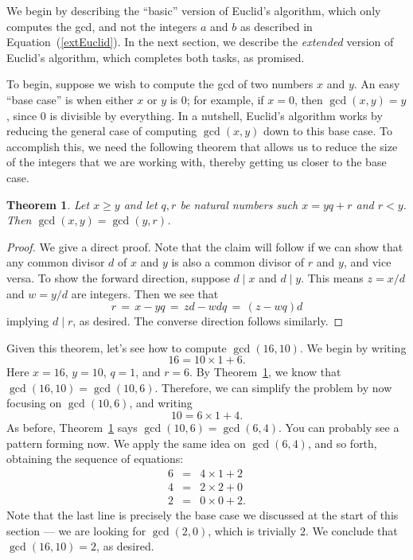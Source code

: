 \documentclass[11pt]{article}
\newcounter{thm}
\newtheorem{theorem}{Theorem}[thm]
\begin{document}
We begin by describing the ``basic'' version of Euclid's algorithm, which only computes the gcd, and not the integers $a$ and $b$ as described in Equation~(\ref{extEuclid}). In the next section, we describe the \emph{extended} version of Euclid's algorithm, which completes both tasks, as promised.

To begin, suppose we wish to compute the gcd of two numbers $x$ and $y$. An easy ``base case'' is when either $x$ or $y$ is 0; for example, if $x=0$, then $\gcd(x,y)=y$, since $0$ is divisible by everything. In a nutshell, Euclid's algorithm works by reducing the general case of computing $\gcd(x,y)$ down to this base case. To accomplish this, we need the following theorem that allows us to reduce the size of the integers that we are working with, thereby getting us closer to the base case.

\begin{theorem}\label{thm:samediv}
Let $x \geq y$ and let $q, r$ be natural numbers such $x = yq + r$ and $r < y$.
Then $\gcd(x,y) = \gcd(y,r)$.
\end{theorem}

\begin{proof}
We give a direct proof. Note that the claim will follow if we can show that any common divisor $d$ of $x$ and $y$ is also a common divisor of $r$ and $y$, and vice versa. To show the forward direction, suppose $d \mid x$ and $d \mid y$. This means $z = x / d$ and $w = y / d$ are integers. Then we see that
$$r \,=\, x - yq \,=\, zd - wdq \,=\, (z - wq)d$$
implying $d\mid r$, as desired. The converse direction follows similarly.
\end{proof}


Given this theorem, let's see how to compute $\gcd(16,10)$. We begin by writing
\[
	16= 10\times 1 + 6.
\]
Here $x = 16$, $y = 10$, $q = 1$, and $r = 6$. By Theorem~\ref{thm:samediv}, we know that $\gcd(16,10)=\gcd(10,6)$. Therefore, we can simplify the problem by now focusing on $\gcd(10,6)$, and writing
\[
	10= 6 \times 1 + 4.
\]
As before, Theorem~\ref{thm:samediv} says $\gcd(10,6)=\gcd(6,4)$. You can probably see a pattern forming now. We apply the same idea on $\gcd(6,4)$, and so forth, obtaining the sequence of equations:
\begin{eqnarray*}
	6 &=& 4 \times 1 + 2\\
	4 &=& 2\times 2 + 0\\
	2 &=& 0\times 0 + 2.
\end{eqnarray*}
Note that the last line is precisely the base case we discussed at the start of this section --- we are looking for $\gcd(2,0)$, which is trivially $2$. We conclude that $\gcd(16,10)=2$, as desired. %
\end{document}

